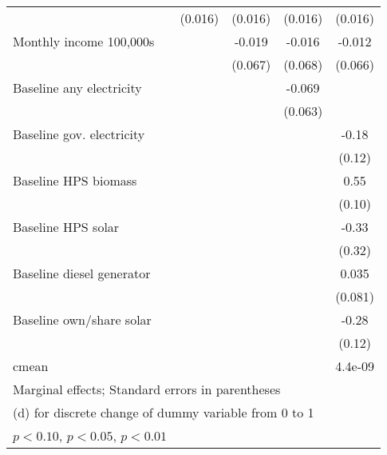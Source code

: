 \begin{table}[htbp]
\begin{tabular*}{1\hsize}{@{\hskip\tabcolsep\extracolsep\fill}l*{5}{c}}
                &                  &  (0.016)         &  (0.016)         &  (0.016)         &  (0.016)         \\
Monthly income 100,000s&                  &                  &   -0.019         &   -0.016         &   -0.012         \\
                &                  &                  &  (0.067)         &  (0.068)         &  (0.066)         \\
Baseline any electricity&                  &                  &                  &   -0.069         &                  \\
                &                  &                  &                  &  (0.063)         &                  \\
Baseline gov. electricity&                  &                  &                  &                  &    -0.18         \\
                &                  &                  &                  &                  &   (0.12)         \\
Baseline HPS biomass&                  &                  &                  &                  &     0.55\sym{***}\\
                &                  &                  &                  &                  &   (0.10)         \\
Baseline HPS solar&                  &                  &                  &                  &    -0.33         \\
                &                  &                  &                  &                  &   (0.32)         \\
Baseline diesel generator&                  &                  &                  &                  &    0.035         \\
                &                  &                  &                  &                  &  (0.081)         \\
Baseline own/share solar&                  &                  &                  &                  &    -0.28\sym{**} \\
                &                  &                  &                  &                  &   (0.12)         \\
\midrule
cmean           &                  &                  &                  &                  &  4.4e-09         \\
\bottomrule
\multicolumn{6}{l}{\footnotesize Marginal effects; Standard errors in parentheses}\\
\multicolumn{6}{l}{\footnotesize  (d) for discrete change of dummy variable from 0 to 1}\\
\multicolumn{6}{l}{\footnotesize \sym{*} \(p<0.10\), \sym{**} \(p<0.05\), \sym{***} \(p<0.01\)}\\
\end{tabular*}
\end{table}
